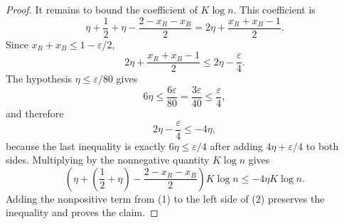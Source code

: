 \begin{proof}
It remains to bound the coefficient of \(K\log n\).  This coefficient is
\[
\eta+\frac12+\eta-\frac{2-x_R-x_B}{2}
=2\eta+\frac{x_R+x_B-1}{2}.
\]
Since \(x_R+x_B\le1-\varepsilon/2\),
\[
2\eta+\frac{x_R+x_B-1}{2}
\le 2\eta-\frac{\varepsilon}{4}.
\]
The hypothesis \(\eta\le\varepsilon/80\) gives
\[
6\eta\le \frac{6\varepsilon}{80}
=\frac{3\varepsilon}{40}
\le \frac{\varepsilon}{4},
\]
and therefore
\[
2\eta-\frac{\varepsilon}{4}
\le -4\eta,
\]
because the last inequality is exactly
\(6\eta\le\varepsilon/4\) after adding \(4\eta+\varepsilon/4\) to both sides.
Multiplying by the nonnegative quantity \(K\log n\) gives
\[
\left(\eta+\left(\frac12+\eta\right)-\frac{2-x_R-x_B}{2}\right)K\log n
\le -4\eta K\log n. \tag{2}
\]
Adding the nonpositive term from (1) to the left side of (2) preserves the
inequality and proves the claim.
\end{proof}
